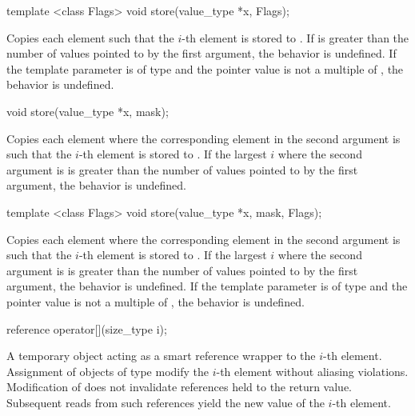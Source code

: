 \begin{wgText}
  \begin{itemdecl}
template <class Flags> void store(value_type *x, Flags);
  \end{itemdecl}
  \begin{itemdescr}
    \pnum\effects Copies each element such that the $i$-th element is stored to .
    \pnum\remarks If \mask{} is greater than the number of values pointed to by the first argument, the behavior is undefined.
    \pnum\remarks If the template parameter is of type  and the pointer value is not a multiple of , the behavior is undefined.
  \end{itemdescr}

  \begin{itemdecl}
void store(value_type *x, mask);
  \end{itemdecl}
  \begin{itemdescr}
    \pnum\effects Copies each element where the corresponding element in the second argument is \true such that the $i$-th element is stored to .
    \pnum\remarks If the largest $i$ where the second argument is \true is greater than the number of values pointed to by the first argument, the behavior is undefined.
  \end{itemdescr}

  \begin{itemdecl}
template <class Flags> void store(value_type *x, mask, Flags);
  \end{itemdecl}
  \begin{itemdescr}
    \pnum\effects Copies each element where the corresponding element in the second argument is \true such that the $i$-th element is stored to .
    \pnum\remarks If the largest $i$ where the second argument is \true is greater than the number of values pointed to by the first argument, the behavior is undefined.
    \pnum\remarks If the template parameter is of type  and the pointer value is not a multiple of , the behavior is undefined.
  \end{itemdescr}

  \begin{itemdecl}
reference operator[](size_type i);
  \end{itemdecl}
  \begin{itemdescr}
    \pnum\returns A temporary object acting as a smart reference wrapper to the $i$-th element.
    \pnum\postconditions Assignment of objects of type \bool modify the $i$-th element without aliasing violations.
    \pnum                Modification of  does not invalidate references held to the return value.
    Subsequent reads from such references yield the new value of the $i$-th element.
  \end{itemdescr}


\end{wgText}
